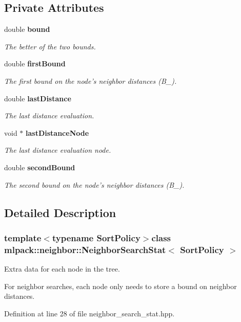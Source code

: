 \subsection*{Private Attributes}
\begin{DoxyCompactItemize}
\item 
double {\bf bound}
\begin{DoxyCompactList}\small\item\em The better of the two bounds. \end{DoxyCompactList}\item 
double {\bf first\-Bound}
\begin{DoxyCompactList}\small\item\em The first bound on the node's neighbor distances (B\-\_). \end{DoxyCompactList}\item 
double {\bf last\-Distance}
\begin{DoxyCompactList}\small\item\em The last distance evaluation. \end{DoxyCompactList}\item 
void $\ast$ {\bf last\-Distance\-Node}
\begin{DoxyCompactList}\small\item\em The last distance evaluation node. \end{DoxyCompactList}\item 
double {\bf second\-Bound}
\begin{DoxyCompactList}\small\item\em The second bound on the node's neighbor distances (B\-\_). \end{DoxyCompactList}\end{DoxyCompactItemize}


\subsection{Detailed Description}
\subsubsection*{template$<$typename Sort\-Policy$>$class mlpack\-::neighbor\-::\-Neighbor\-Search\-Stat$<$ Sort\-Policy $>$}

Extra data for each node in the tree. 

For neighbor searches, each node only needs to store a bound on neighbor distances. 

Definition at line 28 of file neighbor\-\_\-search\-\_\-stat.\-hpp.



